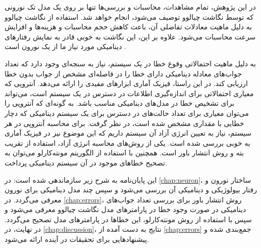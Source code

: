 در این پژوهش، تمام مشاهدات، محاسبات و بررسی‌ها تنها بر روی یک مدل تک نورونی که توسط نگاشت چیالوو توصیف می‌شود، انجام خواهد شد.
استفاده از نگاشت چیالوو به دلیل ماهیت معادلات تفاضلی آن، باعث کاهش حجم محاسبات و هزینه‌ها و افزایش سرعت محاسبات می‌شود.
علاوه بر این، این نگاشت به خوبی قادر به نمایش رفتارهای دینامیکی مورد نیاز ما از یک نورون است
\cite{izhikevich2004}.

به دلیل ماهیت احتمالاتی وقوع خطا در یک سیستم، نیاز به سنجه‌ای وجود دارد که تعداد جواب‌های معادله دینامیکی دارای خطا را در فاصله‌ای مشخص از جواب بدون خطا ارزیابی کند.
در این راستا، فیزیک آماری ابزارهای مفیدی را ارائه می‌دهد.
آنتروپی که معیاری احتمالاتی برای اندازه‌گیری اطلاعات در دسترس در یک سیستم است، می‌تواند برای تشخیص خطا در مدل‌های دینامیکی مناسب باشد.
به گونه‌ای که آنتروپی را می‌توان معیاری برای تعداد حالت‌های در دسترس برای یک سیستم دینامیکی که دچار خطایی با مقداری مشخص شده است، در نظر گرفت.
برای محاسبه آنتروپی در هر سیستم، نیاز به تعیین انرژی آزاد آن سیستم داریم که این موضوع نیز در فیزیک آماری به خوبی بررسی شده است.
یکی از روش‌های محاسبه انرژی آزاد، استفاده از تقریب بته و روش انتشار باور است.
همچنین با استفاده از الگوریتم مونته‌کارلو می‌توان به تصحیح خطاهای موجود در آن سیستم دینامیکی پرداخت.

این پایان‌نامه به شرح زیر سازماندهی شده است:
در
\autoref{chap:neuron}،
ساختار نورون و رفتار بیولوژیکی و دینامیکی آن بررسی می‌شود و سپس چند مدل دینامیکی برای نورون معرفی می‌گردد.
در
\autoref{chap:errors}،
روش انتشار باور برای بررسی تعداد جواب‌های دینامیکی در صورت وجود خطا در پارامترهای مدل نگاشت چیالوو معرفی می‌شود و سپس با استفاده از روش مونته‌کارلو، این خطاها در پارامترهای مدل تصحیح می‌گردد.
در نهایت، در
\autoref{chap:discussion}،
نتایج به دست آمده از
\autoref{chap:errors}
جمع‌بندی شده و پیشنهادهایی برای تحقیقات در آینده ارائه می‌شود.

